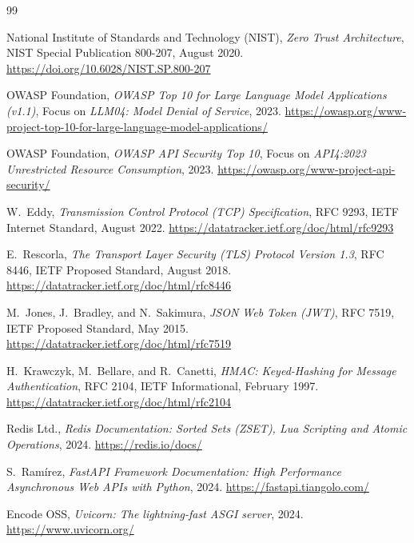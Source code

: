 \begin{thebibliography}{99}

National Institute of Standards and Technology (NIST),
\emph{Zero Trust Architecture},
NIST Special Publication 800-207, August 2020.
\url{https://doi.org/10.6028/NIST.SP.800-207}

OWASP Foundation,
\emph{OWASP Top 10 for Large Language Model Applications (v1.1)},
Focus on \textit{LLM04: Model Denial of Service}, 2023.
\url{https://owasp.org/www-project-top-10-for-large-language-model-applications/}

OWASP Foundation,
\emph{OWASP API Security Top 10},
Focus on \textit{API4:2023 Unrestricted Resource Consumption}, 2023.
\url{https://owasp.org/www-project-api-security/}

W.~Eddy,
\emph{Transmission Control Protocol (TCP) Specification},
RFC 9293, IETF Internet Standard, August 2022.
\url{https://datatracker.ietf.org/doc/html/rfc9293}

E.~Rescorla,
\emph{The Transport Layer Security (TLS) Protocol Version 1.3},
RFC 8446, IETF Proposed Standard, August 2018.
\url{https://datatracker.ietf.org/doc/html/rfc8446}

M.~Jones, J.~Bradley, and N.~Sakimura,
\emph{JSON Web Token (JWT)},
RFC 7519, IETF Proposed Standard, May 2015.
\url{https://datatracker.ietf.org/doc/html/rfc7519}

H.~Krawczyk, M.~Bellare, and R.~Canetti,
\emph{HMAC: Keyed-Hashing for Message Authentication},
RFC 2104, IETF Informational, February 1997.
\url{https://datatracker.ietf.org/doc/html/rfc2104}

Redis Ltd.,
\emph{Redis Documentation: Sorted Sets (ZSET), Lua Scripting and Atomic Operations},
2024.
\url{https://redis.io/docs/}

S.~Ramírez,
\emph{FastAPI Framework Documentation: High Performance Asynchronous Web APIs with Python},
2024.
\url{https://fastapi.tiangolo.com/}

Encode OSS,
\emph{Uvicorn: The lightning-fast ASGI server},
2024.
\url{https://www.uvicorn.org/}

\end{thebibliography}
